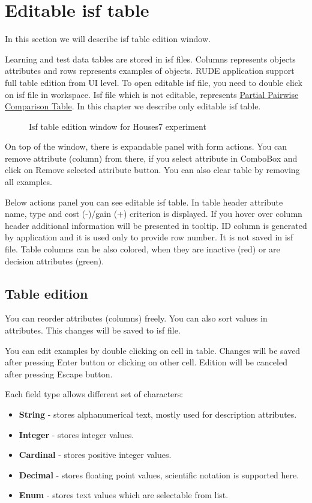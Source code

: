 \section{Editable isf table}\label{section:isf-table}

In this section we will describe isf table edition window.

Learning and test data tables are stored in isf files. Columns represents objects attributes and rows represents examples of objects. RUDE application support full table edition from UI level. To open editable isf file, you need to double click on isf file in workspace. Isf file which is not editable, represents \hyperref[sub:pct-isf]{Partial Pairwise Comparison Table}. In this chapter we describe only editable isf table.

\begin{figure*}[!ht] 
	\centering
	\caption{Isf table edition window for Houses7 experiment}
\end{figure*}

On top of the window, there is expandable panel with form actions.
You can remove attribute (column) from there, if you select attribute in ComboBox and click on Remove selected attribute button. You can also clear table by removing all examples.

Below actions panel you can see editable isf table. In table header attribute name, type and cost (-)/gain (+) criterion is displayed. If you hover over column header additional information will be presented in tooltip. ID column is generated by application and it is used only to provide row number. It is not saved in isf file. Table columns can be also colored, when they are inactive (red) or are decision attributes (green).

\subsection{Table edition}\label{sub:isf-examples}

You can reorder attributes (columns) freely. You can also sort values in attributes. This changes will be saved to isf file.

You can edit examples by double clicking on cell in table. Changes will be saved after pressing Enter button or clicking on other cell. Edition will be canceled after pressing Escape button.

Each field type allows different set of characters:
\begin{itemize}
	\item \textbf{String} - stores alphanumerical text, mostly used for description attributes.
	\item \textbf{Integer} - stores integer values.
	\item \textbf{Cardinal} - stores positive integer values.
	\item \textbf{Decimal} - stores floating point values, scientific notation is supported here.
	\item \textbf{Enum} - stores text values which are selectable from list.
\end{itemize}

